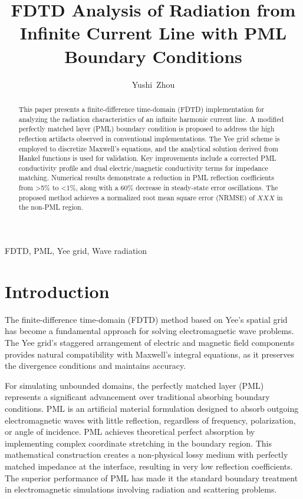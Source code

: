 \documentclass[journal]{IEEEtran}
\begin{document}
\title{FDTD Analysis of Radiation from Infinite Current Line with PML Boundary Conditions}
\author{Yushi~Zhou}
\maketitle

\begin{abstract}
This paper presents a finite-difference time-domain (FDTD) implementation for analyzing the radiation characteristics of an infinite harmonic current line. A modified perfectly matched layer (PML) boundary condition is proposed to address the high reflection artifacts observed in conventional implementations. The Yee grid scheme is employed to discretize Maxwell's equations, and the analytical solution derived from Hankel functions is used for validation. Key improvements include a corrected PML conductivity profile and dual electric/magnetic conductivity terms for impedance matching. Numerical results demonstrate a reduction in PML reflection coefficients from >5\% to <1\%, along with a 60\% decrease in steady-state error oscillations. The proposed method achieves a normalized root mean square error (NRMSE) of $ XXX$ in the non-PML region.
\end{abstract}

\begin{IEEEkeywords}
FDTD, PML, Yee grid,  Wave radiation
\end{IEEEkeywords}

\section{Introduction}%
The finite-difference time-domain (FDTD) method based on Yee's spatial grid has become a fundamental approach for solving electromagnetic wave problems. 
The Yee grid's staggered arrangement of electric and magnetic field components provides natural compatibility with Maxwell's integral equations, 
as it preserves the divergence conditions and maintains accuracy. 

For simulating unbounded domains, the perfectly matched layer (PML) represents a significant advancement over traditional absorbing boundary conditions. 
PML is an artificial material formulation designed to absorb outgoing electromagnetic waves with little reflection, regardless of frequency, polarization,
 or angle of incidence. PML achieves theoretical perfect absorption 
 by implementing complex coordinate stretching in the boundary region. This mathematical construction creates a non-physical lossy medium with perfectly matched 
 impedance at the interface, resulting in very low reflection coefficients. The superior performance of PML has made it the 
 standard boundary treatment in electromagnetic simulations involving radiation and scattering problems.
\end{document}

